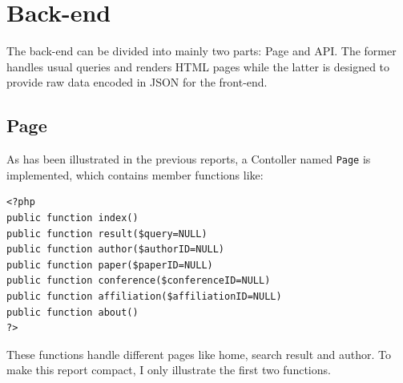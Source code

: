 \documentclass[a4paper]{article}
\begin{document}
    \section{Back-end}
The back-end can be divided into mainly two parts: Page and API. The former handles usual queries and 
renders HTML pages while the latter is designed to provide raw data encoded in JSON for the front-end.
        \subsection{Page}
As has been illustrated in the previous reports, a Contoller named \texttt{Page} is implemented, which contains member
functions like:
\begin{verbatim}
<?php
public function index()
public function result($query=NULL)
public function author($authorID=NULL)
public function paper($paperID=NULL)
public function conference($conferenceID=NULL)
public function affiliation($affiliationID=NULL)
public function about()
?>
\end{verbatim}
These functions handle different pages like home, search result and author. To make this report compact, I only
illustrate the first two functions.
\end{document}
